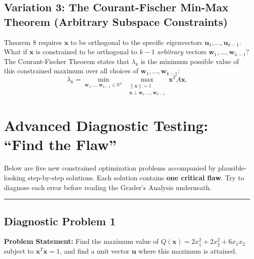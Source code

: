 \documentclass[11pt, letterpaper]{article}
\theoremstyle{definition}
\theoremstyle{remark}
\newcommand{\R}{\mathbb{R}}
\begin{document}
\subsection{Variation 3: The Courant-Fischer Min-Max Theorem (Arbitrary Subspace Constraints)}
Theorem 8 requires $\mathbf{x}$ to be orthogonal to the specific eigenvectors $\mathbf{u}_1, \dots, \mathbf{u}_{k-1}$. What if $\mathbf{x}$ is constrained to be orthogonal to $k-1$ \emph{arbitrary} vectors $\mathbf{w}_1, \dots, \mathbf{w}_{k-1}$? The Courant-Fischer Theorem states that $\lambda_k$ is the minimum possible value of this constrained maximum over all choices of $\mathbf{w}_1, \dots, \mathbf{w}_{k-1}$:
\[
\lambda_k = \min_{\mathbf{w}_1, \dots, \mathbf{w}_{k-1} \in \R^n} \ \max_{\substack{\|\mathbf{x}\|=1 \\ \mathbf{x} \perp \mathbf{w}_1, \dots, \mathbf{w}_{k-1}}} \mathbf{x}^T A \mathbf{x}.
\]

\newpage
\section{Advanced Diagnostic Testing: ``Find the Flaw''}

Below are five new constrained optimization problems accompanied by plausible-looking step-by-step solutions. Each solution contains \textbf{one critical flaw}. Try to diagnose each error before reading the Grader's Analysis underneath.

\medskip
\hrule
\medskip

\subsection*{Diagnostic Problem 1}
\textbf{Problem Statement:} Find the maximum value of $Q(\mathbf{x}) = 2x_1^2 + 2x_2^2 + 6x_1x_2$ subject to $\mathbf{x}^T\mathbf{x} = 1$, and find a unit vector $\mathbf{u}$ where this maximum is attained.
\end{document}
